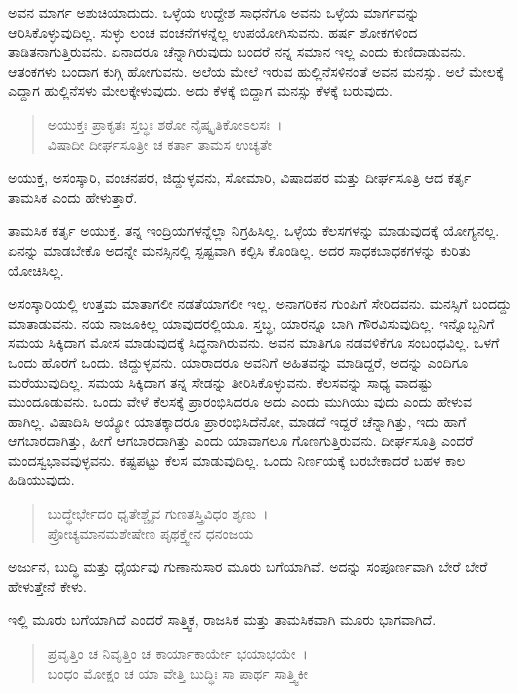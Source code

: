 ಅವನ ಮಾರ್ಗ ಅಶುಚಿಯಾದುದು. ಒಳ್ಳೆಯ ಉದ್ದೇಶ ಸಾಧನೆಗೂ ಅವನು ಒಳ್ಳೆಯ ಮಾರ್ಗವನ್ನು ಆರಿಸಿಕೊಳ್ಳುವುದಿಲ್ಲ. ಸುಳ್ಳು ಲಂಚ ವಂಚನೆಗಳನ್ನೆಲ್ಲ ಉಪಯೋಗಿಸುವನು. ಹರ್ಷ ಶೋಕಗಳಿಂದ ತಾಡಿತನಾಗುತ್ತಿರುವನು. ಏನಾದರೂ ಚೆನ್ನಾಗಿರುವುದು ಬಂದರೆ ನನ್ನ ಸಮಾನ ಇಲ್ಲ ಎಂದು ಕುಣಿದಾಡುವನು. ಆತಂಕಗಳು ಬಂದಾಗ ಕುಗ್ಗಿ ಹೋಗುವನು. ಅಲೆಯ ಮೇಲೆ ಇರುವ ಹುಲ್ಲಿನೆಸಳಿನಂತೆ ಅವನ ಮನಸ್ಸು. ಅಲೆ ಮೇಲಕ್ಕೆ ಎದ್ದಾಗ ಹುಲ್ಲಿನೆಸಳು ಮೇಲಕ್ಕೇಳುವುದು. ಅದು ಕೆಳಕ್ಕೆ ಬಿದ್ದಾಗ ಮನಸ್ಸು ಕೆಳಕ್ಕೆ ಬರುವುದು.

\begin{verse}
ಅಯುಕ್ತಃ ಪ್ರಾಕೃತಃ ಸ್ತಬ್ಧಃ ಶಠೋ ನೈಷ್ಕೃತಿಕೋಽಲಸಃ~।\\ವಿಷಾದೀ ದೀರ್ಘಸೂತ್ರೀ ಚ ಕರ್ತಾ ತಾಮಸ ಉಚ್ಯತೇ 
\end{verse}

{\small ಅಯುಕ್ತ, ಅಸಂಸ್ಕಾರಿ, ವಂಚನಪರ, ಜಿದ್ದುಳ್ಳವನು, ಸೋಮಾರಿ, ವಿಷಾದಪರ ಮತ್ತು ದೀರ್ಘಸೂತ್ರಿ ಆದ ಕರ್ತೃ ತಾಮಸಿಕ ಎಂದು ಹೇಳುತ್ತಾರೆ.}

ತಾಮಸಿಕ ಕರ್ತೃ ಅಯುಕ್ತ. ತನ್ನ ಇಂದ್ರಿಯಗಳನ್ನೆಲ್ಲಾ ನಿಗ್ರಹಿಸಿಲ್ಲ. ಒಳ್ಳೆಯ ಕೆಲಸಗಳನ್ನು ಮಾಡುವುದಕ್ಕೆ ಯೋಗ್ಯನಲ್ಲ. ಏನನ್ನು ಮಾಡಬೇಕೊ ಅದನ್ನೇ ಮನಸ್ಸಿನಲ್ಲಿ ಸ್ಪಷ್ಟವಾಗಿ ಕಲ್ಪಿಸಿ ಕೊಂಡಿಲ್ಲ. ಅದರ ಸಾಧಕಬಾಧಕಗಳನ್ನು ಕುರಿತು ಯೋಚಿಸಿಲ್ಲ.

ಅಸಂಸ್ಕಾರಿಯಲ್ಲಿ ಉತ್ತಮ ಮಾತಾಗಲೀ ನಡತೆಯಾಗಲೀ ಇಲ್ಲ. ಅನಾಗರಿಕನ ಗುಂಪಿಗೆ ಸೇರಿದವನು. ಮನಸ್ಸಿಗೆ ಬಂದದ್ದು ಮಾತಾಡುವನು. ನಯ ನಾಜೂಕಿಲ್ಲ ಯಾವುದರಲ್ಲಿಯೂ. ಸ್ತಬ್ಧ, ಯಾರನ್ನೂ ಬಾಗಿ ಗೌರವಿಸುವುದಿಲ್ಲ. ಇನ್ನೊಬ್ಬನಿಗೆ ಸಮಯ ಸಿಕ್ಕಿದಾಗ ಮೋಸ ಮಾಡುವುದಕ್ಕೆ ಸಿದ್ಧನಾಗಿರುವನು. ಅವನ ಮಾತಿಗೂ ನಡವಳಿಕೆಗೂ ಸಂಬಂಧವಿಲ್ಲ. ಒಳಗೆ ಒಂದು ಹೊರಗೆ ಒಂದು. ಜಿದ್ದುಳ್ಳವನು. ಯಾರಾದರೂ ಅವನಿಗೆ ಅಹಿತವನ್ನು ಮಾಡಿದ್ದರೆ, ಅದನ್ನು ಎಂದಿಗೂ ಮರೆಯುವುದಿಲ್ಲ. ಸಮಯ ಸಿಕ್ಕಿದಾಗ ತನ್ನ ಸೇಡನ್ನು ತೀರಿಸಿಕೊಳ್ಳುವನು. ಕೆಲಸವನ್ನು ಸಾಧ್ಯ ವಾದಷ್ಟು ಮುಂದೂಡುವನು. ಒಂದು ವೇಳೆ ಕೆಲಸಕ್ಕೆ ಪ್ರಾರಂಭಿಸಿದರೂ ಅದು ಎಂದು ಮುಗಿಯು ವುದು ಎಂದು ಹೇಳುವ ಹಾಗಿಲ್ಲ. ವಿಷಾದಿಸಿ ಅಯ್ಯೋ ಯಾತಕ್ಕಾದರೂ ಪ್ರಾರಂಭಿಸಿದೆನೋ, ಮಾಡದೆ ಇದ್ದರೆ ಚೆನ್ನಾಗಿತ್ತು, ಇದು ಹಾಗೆ ಆಗಬಾರದಾಗಿತ್ತು, ಹೀಗೆ ಆಗಬಾರದಾಗಿತ್ತು ಎಂದು ಯಾವಾಗಲೂ ಗೊಣಗುತ್ತಿರುವನು. ದೀರ್ಘಸೂತ್ರಿ ಎಂದರೆ ಮಂದಸ್ವಭಾವವುಳ್ಳವನು. ಕಷ್ಟಪಟ್ಟು ಕೆಲಸ ಮಾಡುವುದಿಲ್ಲ. ಒಂದು ನಿರ್ಣಯಕ್ಕೆ ಬರಬೇಕಾದರೆ ಬಹಳ ಕಾಲ ಹಿಡಿಯುವುದು.

\begin{verse}
ಬುದ್ಧೇರ್ಭೇದಂ ಧೃತೇಶ್ಚೈವ ಗುಣತಸ್ತ್ರಿವಿಧಂ ಶೃಣು~।\\ಪ್ರೋಚ್ಯಮಾನಮಶೇಷೇಣ ಪೃಥಕ್ತ್ವೇನ ಧನಂಜಯ 
\end{verse}

{\small ಅರ್ಜುನ, ಬುದ್ಧಿ ಮತ್ತು ಧೈರ್ಯವು ಗುಣಾನುಸಾರ ಮೂರು ಬಗೆಯಾಗಿವೆ. ಅದನ್ನು ಸಂಪೂರ್ಣವಾಗಿ ಬೇರೆ ಬೇರೆ ಹೇಳುತ್ತೇನೆ ಕೇಳು.}

ಇಲ್ಲಿ ಮೂರು ಬಗೆಯಾಗಿದೆ ಎಂದರೆ ಸಾತ್ತ್ವಿಕ, ರಾಜಸಿಕ ಮತ್ತು ತಾಮಸಿಕವಾಗಿ ಮೂರು ಭಾಗವಾಗಿದೆ.

\begin{verse}
ಪ್ರವೃತ್ತಿಂ ಚ ನಿವೃತ್ತಿಂ ಚ ಕಾರ್ಯಾಕಾರ್ಯೇ ಭಯಾಭಯೇ~।\\ಬಂಧಂ ಮೋಕ್ಷಂ ಚ ಯಾ ವೇತ್ತಿ ಬುದ್ಧಿಃ ಸಾ ಪಾರ್ಥ ಸಾತ್ತ್ವಿಕೀ 
\end{verse}

